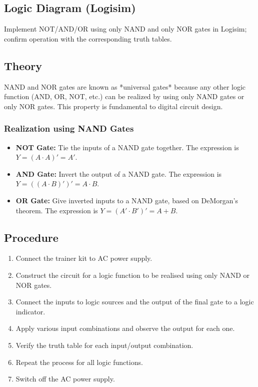 \documentclass[11pt]{article}
\begin{document}
\subsection{Logic Diagram (Logisim)}
Implement NOT/AND/OR using only NAND and only NOR gates in Logisim; confirm operation with the corresponding truth tables.


\subsection{Theory}
NAND and NOR gates are known as *universal gates* because any other logic function (AND, OR, NOT, etc.) can be realized by using only NAND gates or only NOR gates. This property is fundamental to digital circuit design.

\subsubsection{Realization using NAND Gates}
\begin{itemize}
    \item \textbf{NOT Gate:} Tie the inputs of a NAND gate together. The expression is $Y=(A \cdot A)' = A'$.
    \item \textbf{AND Gate:} Invert the output of a NAND gate. The expression is $Y=((A \cdot B)')' = A \cdot B$.
    \item \textbf{OR Gate:} Give inverted inputs to a NAND gate, based on DeMorgan's theorem. The expression is $Y=(A' \cdot B')' = A + B$.
\end{itemize}

\subsection{Procedure}
\begin{enumerate}
    \item Connect the trainer kit to AC power supply.
    \item Construct the circuit for a logic function to be realised using only NAND or NOR gates.
    \item Connect the inputs to logic sources and the output of the final gate to a logic indicator.
    \item Apply various input combinations and observe the output for each one.
    \item Verify the truth table for each input/output combination.
    \item Repeat the process for all logic functions.
    \item Switch off the AC power supply.
\end{enumerate}
\end{document}
